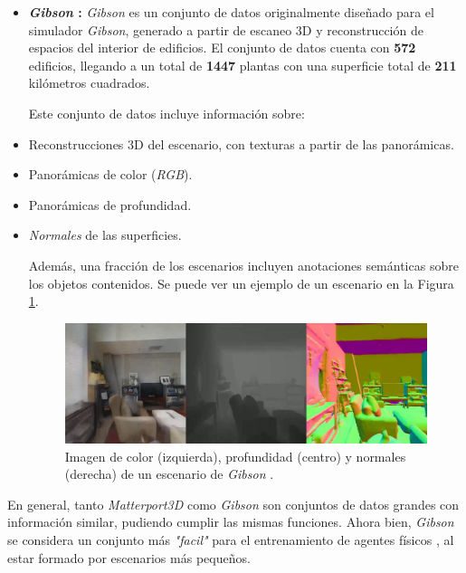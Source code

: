 \begin{itemize}
	\item \textbf{\textit{Gibson} \cite{xiazamirhe2018gibsonenv}:}	\textit{Gibson} es un conjunto de datos originalmente diseñado para el simulador \textit{Gibson}, generado a partir de escaneo 3D y reconstrucción de espacios del interior de edificios. El conjunto de datos cuenta con \textbf{572} edificios, llegando a un total de \textbf{1447} plantas con una superficie total de \textbf{211} kilómetros cuadrados.
	
	Este conjunto de datos incluye información sobre:
	\item Reconstrucciones 3D del escenario, con texturas a partir de las panorámicas.
		\item Panorámicas de color (\textit{RGB}).
		\item Panorámicas de profundidad.
		\item \textit{Normales} de las superficies.
		
	Además, una fracción de los escenarios incluyen anotaciones semánticas sobre los objetos contenidos. Se puede ver un ejemplo de un escenario en la Figura \ref{fig:chap4-gibson}.

\begin{figure}[h]
    \centering
    \includegraphics[width=\textwidth]{imagenes/cap4/gibson.jpg}
    \caption{Imagen de color (izquierda), profundidad (centro) y normales (derecha) de un escenario de \textit{Gibson} \cite{xiazamirhe2018gibsonenv}.}
    \label{fig:chap4-gibson}
\end{figure}

\end{itemize}

En general, tanto \textit{Matterport3D} como \textit{Gibson} son conjuntos de datos grandes con información similar, pudiendo cumplir las mismas funciones. Ahora bien, \textit{Gibson} se considera un conjunto más \textit{"facil"} para el entrenamiento de agentes físicos \cite{habitat19iccv}, al estar formado por escenarios más pequeños.

